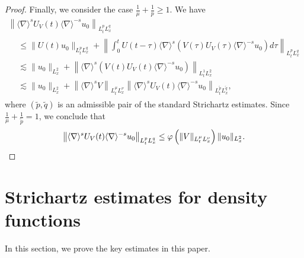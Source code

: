 \documentclass[AHL,Unicode,longabstracts,MathTools,published]{cedram}
\newcommand{\ph}{\varphi}
\newcommand{\ta}{\tau}
\newcommand{\wt}{\widetilde}
\renewcommand{\No}[1]{\left\| #1 \right\|}
\newcommand{\sd}{\langle \nabla \rangle}
\newcommand{\ls}{\lesssim}
\begin{document}
\begin{proof}
Finally, we consider the case $\frac{1}{\mu}+\frac{1}{p} \ge 1$. We have
\begin{multline}
\left\|\sd^s U_V(t)\sd^{-s} u_0\right\|_{L^p_t L^q_x} \\
\begin{aligned}
&\le \|U(t)u_0\|_{L^p_t L^q_x} + \No{ \int_0^t U(t-\ta)\sd^s (V(\ta)U_V(\ta) \sd^{-s}u_0)d\ta }_{L^p_t L^q_x} \\
&\ls \|u_0\|_{L^2_x} + \left\|\sd^s (V(t)U_V(t)\sd^{-s}u_0)\right\|_{L^1_t L^2_x} \\
&\ls \|u_0\|_{L^2_x} + \left\|\sd^s V\right\|_{L^\mu_t L^\nu_x} \left\|\sd^s U_V(t)\sd^{-s} u_0\right\|_{L^{\wt{p}}_t L^{\wt{q}}_x},
\end{aligned}
\end{multline}
where $(\wt{p}, \wt{q})$ is an admissible pair of the standard Strichartz estimates. Since $\frac{1}{\mu}+\frac{1}{\wt{p}} = 1$, we conclude that
\begin{equation}
\left\|\sd^s U_V(t)\sd^{-s} u_0\right\|_{L^p_t L^q_x}
\le \ph\left(\|V\|_{L^\mu_t L^\nu_x}\right) \|u_0\|_{L^2_x}.\qedhere
\end{equation}
\end{proof}



\section{Strichartz estimates for density functions}\label{sect4}

In this section, we prove the key estimates in this paper.
\end{document}
